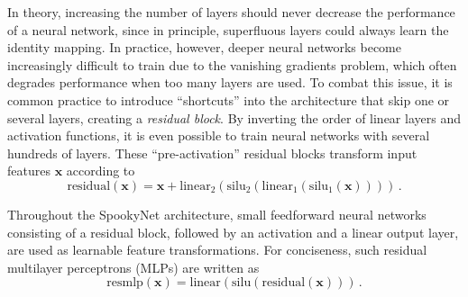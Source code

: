\documentclass[%
superscriptaddress,
reprint,
nofootinbib,
amsmath,amssymb,amsfonts,
floatfix,
altaffilletter,
showkeys,
]{revtex4-2}
\newcommand{\nn}{SpookyNet}
\begin{document}
In theory, increasing the number of layers should never decrease the performance of a neural network, since in principle, superfluous layers could always learn the identity mapping. In practice, however, deeper neural networks become increasingly difficult to train due to the vanishing gradients problem,\cite{glorot2010understanding} which often degrades performance when too many layers are used.
To combat this issue, it is common practice to introduce ``shortcuts'' into the architecture that skip one or several layers,\cite{srivastava2015highway} creating a \emph{residual block}.\cite{he2016deep} By inverting the order of linear layers and activation functions, it is even possible to train neural networks with several hundreds of layers.\cite{he2016identity} These ``pre-activation'' residual blocks transform input features $\mathbf{x}$ according to
\begin{equation}
\mathrm{residual}(\mathbf{x}) = \mathbf{x} + \mathrm{linear}_2(\mathrm{silu}_2(\mathrm{linear}_1(\mathrm{silu}_1(\mathbf{x}))))\,.
\label{eq:residual}
\end{equation}

Throughout the \nn{} architecture, small feedforward neural networks consisting of a residual block, followed by an activation and a linear output layer, are used as learnable feature transformations. For conciseness, such residual multilayer perceptrons (MLPs) are written as
\begin{equation}
\mathrm{resmlp}(\mathbf{x}) = \mathrm{linear}(\mathrm{silu}(\mathrm{residual}(\mathbf{x}))) \,.
\label{eq:resmlp}
\end{equation}
\end{document}
